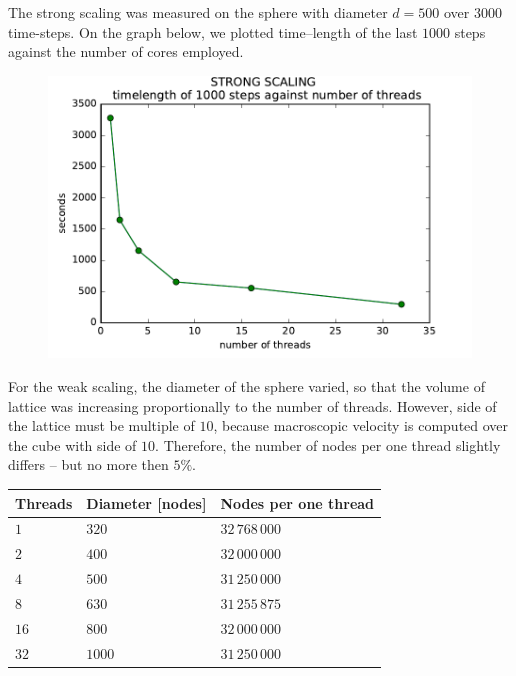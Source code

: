 The strong scaling was measured on the sphere with diameter $d = 500$ over $3000$ time-steps.
On the graph below, we plotted time--length of the last $1000$ steps against the number of cores employed.
\begin{figure}[H]
 \centering 
 \includegraphics[width=1\textwidth]{./img/strongscalingg}
\end{figure}

For the weak scaling, the diameter of the sphere varied, so that the volume of lattice was increasing proportionally to the number of threads. However, side of the lattice must be multiple of $10$, because macroscopic velocity is computed over the cube with side of $10$. Therefore, the number of nodes per one thread slightly differs -- but no more then $5\%$.

\begin{tabular}{ |p{2cm}|p{4cm}|p{4cm}| }
 \hline
 Threads & Diameter [nodes] & Nodes per one thread \\
 \hline
 \hline
$1$ & $320$ & $32\,768\,000$ \\
 \hline
$2$ & $400$ & $32\,000\,000$\\
 \hline
$4$ & $500$ & $31\,250\,000$ \\
 \hline
$8$ & $630$ & $31\,255\,875$\\
 \hline
$16$ & $800$ & $32\,000\,000$ \\
 \hline
$32$ & $1000$ & $31\,250\,000$ \\
 \hline
 \end{tabular}


